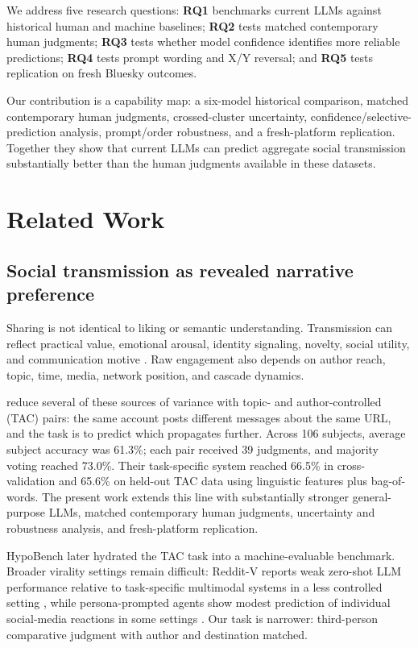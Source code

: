 \documentclass[10pt,twocolumn]{article}
\begin{document}
We address five research questions: \textbf{RQ1} benchmarks current LLMs against historical human and machine baselines; \textbf{RQ2} tests matched contemporary human judgments; \textbf{RQ3} tests whether model confidence identifies more reliable predictions; \textbf{RQ4} tests prompt wording and X/Y reversal; and \textbf{RQ5} tests replication on fresh Bluesky outcomes.

Our contribution is a capability map: a six-model historical comparison, matched contemporary human judgments, crossed-cluster uncertainty, confidence/selective-prediction analysis, prompt/order robustness, and a fresh-platform replication. Together they show that current LLMs can predict aggregate social transmission substantially better than the human judgments available in these datasets.

\section{Related Work}
\subsection{Social transmission as revealed narrative preference}
Sharing is not identical to liking or semantic understanding. Transmission can reflect practical value, emotional arousal, identity signaling, novelty, social utility, and communication motive \citep{berger2012,berger2025}. Raw engagement also depends on author reach, topic, time, media, network position, and cascade dynamics.

\citet{tan2014} reduce several of these sources of variance with topic- and author-controlled (TAC) pairs: the same account posts different messages about the same URL, and the task is to predict which propagates further. Across 106 subjects, average subject accuracy was 61.3\%; each pair received 39 judgments, and majority voting reached 73.0\%. Their task-specific system reached 66.5\% in cross-validation and 65.6\% on held-out TAC data using linguistic features plus bag-of-words. The present work extends this line with substantially stronger general-purpose LLMs, matched contemporary human judgments, uncertainty and robustness analysis, and fresh-platform replication.

HypoBench \citep{liu2025hypo} later hydrated the TAC task into a machine-evaluable benchmark. Broader virality settings remain difficult: Reddit-V reports weak zero-shot LLM performance relative to task-specific multimodal systems in a less controlled setting \citep{elamrany2025}, while persona-prompted agents show modest prediction of individual social-media reactions in some settings \citep{bojic2026}. Our task is narrower: third-person comparative judgment with author and destination matched.
\end{document}

